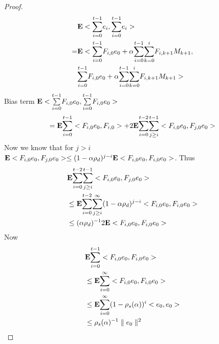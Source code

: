 \begin{proof}
\begin{align*}
&\mathbf{E}<\overset{t-1}{\underset{i=0}{\sum}}e_i ,\overset{t-1}{\underset{i=0}{\sum}} e_i>\nonumber\\
=&\mathbf{E} < \overset{t-1}{\underset{i=0}{\sum}} F_{i,0}e_0+\alpha \overset{t-1}{\underset{i=0}{\sum}} \overset{i}{\underset{k=0}{\sum}} F_{i,k+1}M_{k+1},\nonumber\\ &\overset{t-1}{\underset{i=0}{\sum}} F_{i,0}e_0+\alpha \overset{t-1}{\underset{i=0}{\sum}} \overset{i}{\underset{k=0}{\sum}} F_{i,k+1}M_{k+1} >
\end{align*}
Bias term $\mathbf{E} < \overset{t-1}{\underset{i=0}{\sum}} F_{i,0}e_0, \overset{t-1}{\underset{i=0}{\sum}} F_{i,0}e_0>$
\begin{align*}
=\mathbf{E}\overset{t-1}{\underset{i=0}{\sum}}<F_{i,0}e_0,F_{i,0}>+2 \mathbf{E}\overset{t-2}{\underset{i=0}{\sum}}\overset{t-1}{\underset{j\geq i}{\sum}}<F_{i,0}e_0, F_{j,0}e_0>
\end{align*}
Now we know that for $j>i$ $\mathbf{E}<F_{i,0}e_0, F_{j,0}e_0>\leq (1-\alpha \rho_d)^{j-i}\mathbf{E}<F_{i,0}e_0,F_{i,0}e_0>$. Thus
\begin{align*}
&\mathbf{E}\overset{t-2}{\underset{i=0}{\sum}}\overset{t-1}{\underset{j\geq i}{\sum}}<F_{i,0}e_0, F_{j,0}e_0>\nonumber\\
&\leq \mathbf{E}\overset{t-2}{\underset{i=0}{\sum}}\overset{\infty}{\underset{j\geq i}{\sum}} (1-\alpha \rho_d)^{j-i} <F_{i,0}e_0, F_{i,0}e_0>\nonumber\\
&\leq (\alpha\rho_d)^{-1} 2 \mathbf{E}<F_{i,0}e_0, F_{i,0}e_0>
\end{align*}
Now
\begin{align*}
&\mathbf{E}\overset{t-1}{\underset{i=0}{\sum}}<F_{i,0}e_0,F_{i,0}e_0>\nonumber\\
&\leq\mathbf{E}\overset{\infty}{\underset{i=0}{\sum}}<F_{i,0}e_0,F_{i,0}e_0>\nonumber\\
&\leq\mathbf{E}\overset{\infty}{\underset{i=0}{\sum}}(1-\rho_s(\alpha))^i <e_0,e_0>\nonumber\\
&\leq \rho_s(\alpha)^{-1} \parallel e_0\parallel^2\nonumber
\end{align*}


\end{proof}
